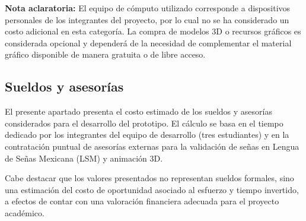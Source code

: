 \noindent \textbf{Nota aclaratoria:}  
El equipo de cómputo utilizado corresponde a dispositivos personales de los integrantes del proyecto, por lo cual no se ha considerado un costo adicional en esta categoría. La compra de modelos 3D o recursos gráficos es considerada opcional y dependerá de la necesidad de complementar el material gráfico disponible de manera gratuita o de libre acceso.

\newpage
\subsection{Sueldos y asesorías}

El presente apartado presenta el costo estimado de los sueldos y asesorías considerados para el desarrollo del prototipo. El cálculo se basa en el tiempo dedicado por los integrantes del equipo de desarrollo (tres estudiantes) y en la contratación puntual de asesorías externas para la validación de señas en Lengua de Señas Mexicana (LSM) y animación 3D. 

Cabe destacar que los valores presentados no representan sueldos formales, sino una estimación del costo de oportunidad asociado al esfuerzo y tiempo invertido, a efectos de contar con una valoración financiera adecuada para el proyecto académico.

\begin{table}[H]
	\centering
	\renewcommand{\arraystretch}{1.5}
	\setlength{\tabcolsep}{10pt}
	\caption{Costos estimados de sueldos y asesorías durante el desarrollo del prototipo}
	\label{tab:sueldos_asesorias}
\end{table}


